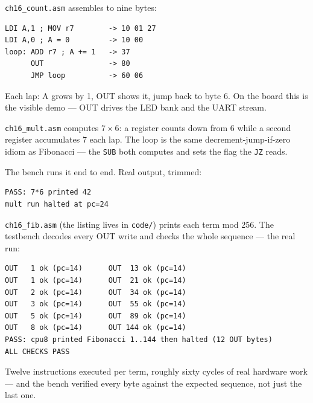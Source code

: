 \begin{example}
\texttt{ch16\_count.asm} assembles to nine bytes:

\begin{lstlisting}[caption={\ttfamily ch16\_count.asm and its
assembly --- \ttfamily ch16\_count.hex.}]
LDI A,1 ; MOV r7        -> 10 01 27
LDI A,0 ; A = 0         -> 10 00
loop: ADD r7 ; A += 1   -> 37
      OUT               -> 80
      JMP loop          -> 60 06
\end{lstlisting}

Each lap: A grows by 1, OUT shows it, jump back to byte 6. On the
board this is the visible demo --- OUT drives the LED bank and the
UART stream.
\end{example}

\begin{example}
\texttt{ch16\_mult.asm} computes $7\times6$: a register counts down
from 6 while a second register accumulates 7 each lap. The loop is
the same decrement-jump-if-zero idiom as Fibonacci --- the
\texttt{SUB} both computes and sets the flag the \texttt{JZ} reads.

The bench runs it end to end. Real output, trimmed:

\begin{lstlisting}[caption={\ttfamily ch16\_cpu8\_mult\_tb.v running
\texttt{mult.hex} --- the machine prints 42 and parks.}]
PASS: 7*6 printed 42
mult run halted at pc=24
\end{lstlisting}
\end{example}

\begin{example}
\texttt{ch16\_fib.asm} (the listing lives in \texttt{code/}) prints
each term mod 256. The testbench decodes every OUT write and checks
the whole sequence --- the real run:

\begin{lstlisting}[caption={\ttfamily ch16\_cpu8\_tb.v running
\texttt{fib.hex} --- twelve correct OUT bytes, then HALT.}]
OUT   1 ok (pc=14)      OUT  13 ok (pc=14)
OUT   1 ok (pc=14)      OUT  21 ok (pc=14)
OUT   2 ok (pc=14)      OUT  34 ok (pc=14)
OUT   3 ok (pc=14)      OUT  55 ok (pc=14)
OUT   5 ok (pc=14)      OUT  89 ok (pc=14)
OUT   8 ok (pc=14)      OUT 144 ok (pc=14)
PASS: cpu8 printed Fibonacci 1..144 then halted (12 OUT bytes)
ALL CHECKS PASS
\end{lstlisting}

Twelve instructions executed per term, roughly sixty cycles of real
hardware work --- and the bench verified every byte against the
expected sequence, not just the last one.
\end{example}

